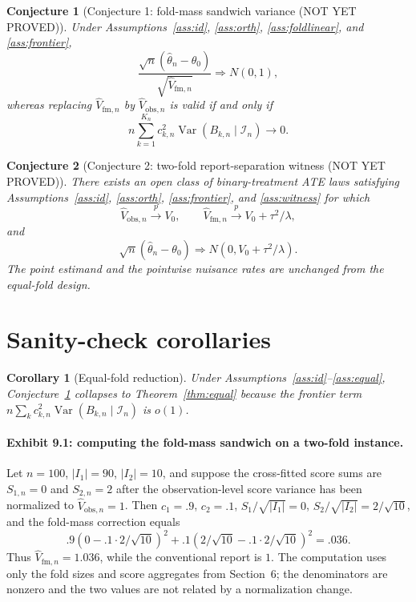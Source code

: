\documentclass[11pt]{article}
\theoremstyle{definition}
\theoremstyle{plain}
\newtheorem{conjecture}{Conjecture}
\newtheorem{corollary}{Corollary}
\theoremstyle{remark}
\begin{document}
\begin{conjecture}[Conjecture 1: fold-mass sandwich variance (NOT YET PROVED)]\label{conj:sandwich}
Under Assumptions~\ref{ass:id}, \ref{ass:orth}, \ref{ass:foldlinear}, and \ref{ass:frontier},
\[
\frac{\sqrt n(\hat\theta_n-\theta_0)}{\sqrt{\hat V_{\mathrm{fm},n}}}\Rightarrow N(0,1),
\]
whereas replacing \(\hat V_{\mathrm{fm},n}\) by \(\hat V_{\mathrm{obs},n}\) is valid if and only if
\[
n\sum_{k=1}^{K_n}c_{k,n}^2\operatorname{Var}(B_{k,n}\mid \mathcal I_n)\to0.
\]
\end{conjecture}

\begin{conjecture}[Conjecture 2: two-fold report-separation witness (NOT YET PROVED)]\label{conj:witness}
There exists an open class of binary-treatment ATE laws satisfying Assumptions~\ref{ass:id}, \ref{ass:orth}, \ref{ass:frontier}, and \ref{ass:witness} for which
\[
\hat V_{\mathrm{obs},n}\stackrel{p}{\to}V_0,\qquad
\hat V_{\mathrm{fm},n}\stackrel{p}{\to}V_0+\tau^2/\lambda,
\]
and
\[
\sqrt n(\hat\theta_n-\theta_0)\Rightarrow N(0,V_0+\tau^2/\lambda).
\]
The point estimand and the pointwise nuisance rates are unchanged from the equal-fold design.
\end{conjecture}

\section{Sanity-check corollaries}
\begin{corollary}[Equal-fold reduction]\label{cor:equal}
Under Assumptions~\ref{ass:id}--\ref{ass:equal}, Conjecture~\ref{conj:sandwich} collapses to Theorem~\ref{thm:equal} because the frontier term \(n\sum_k c_{k,n}^2\operatorname{Var}(B_{k,n}\mid\mathcal I_n)\) is \(o(1)\).
\end{corollary}

\paragraph{Exhibit 9.1: computing the fold-mass sandwich on a two-fold instance.}
Let \(n=100\), \(|I_1|=90\), \(|I_2|=10\), and suppose the cross-fitted score sums are \(S_{1,n}=0\) and \(S_{2,n}=2\) after the observation-level score variance has been normalized to \(\hat V_{\mathrm{obs},n}=1\). Then \(c_1=.9\), \(c_2=.1\), \(S_1/\sqrt{|I_1|}=0\), \(S_2/\sqrt{|I_2|}=2/\sqrt{10}\), and the fold-mass correction equals
\[
.9(0-.1\cdot 2/\sqrt{10})^2+.1(2/\sqrt{10}-.1\cdot2/\sqrt{10})^2=.036.
\]
Thus \(\hat V_{\mathrm{fm},n}=1.036\), while the conventional report is \(1\). The computation uses only the fold sizes and score aggregates from Section~6; the denominators are nonzero and the two values are not related by a normalization change.
\end{document}
